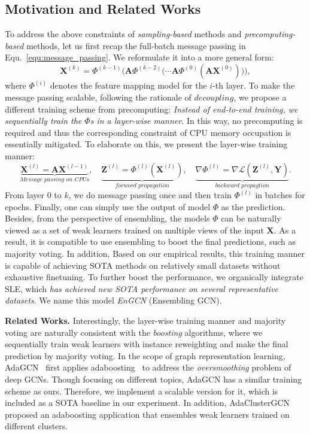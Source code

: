 \message{ !name(main.tex)}\documentclass{article}
\newcommand{\bm}[1]{\mathbf{#1}}
\begin{document}
\subsection{Motivation and Related Works}
\vspace{-1mm}
To address the above constraints of \textit{sampling-based} methods and \textit{precomputing-based} methods, let us first recap the full-batch message passing in Equ.~\eqref{equ:message_passing}. We reformulate it into a more general form:
\begin{equation*}
	\bm{X}^{(k)} = \Phi^{(k-1)}\bigg({\bm{A}}\Phi^{(k-2)}\big(\cdots \bm{A}\Phi^{(0)}({\bm{A}}\bm{X}^{(0)})\big)\bigg),
\end{equation*}
where \(\Phi^{(i)}\) denotes the feature mapping model for the \(i\)-th layer. To make the message passing scalable, following the rationale of \(decoupling\), we propose a different training scheme from precomputing: \textit{Instead of end-to-end training, we sequentially train the \(\Phi\)s in a layer-wise manner.} In this way, no precomputing is required and thus the corresponding constraint of CPU memory occupation is essentially mitigated. To elaborate on this, we present the layer-wise training manner:
\begin{equation}
	\underbrace{\bm{X}^{(l)} = \bm{A}\bm{X}^{(l-1)}}_{\textit{Message passing on CPUs}},\quad \underbrace{\bm{Z}^{(l)}=\Phi^{(l)}(\bm{X}^{(l)})}_{\textit{forword propagation}},\quad \underbrace{\nabla\Phi^{(l)}=\nabla\mathcal{L}(\bm{Z}^{(l)},\bm{Y})}_{\textit{backward propagtion}}.
\end{equation}
From layer \(0\) to \(k\), we do message passing once and then train \(\Phi^{(l)}\) in batches for epochs. Finally, one can simply use the output of model \(\Phi\) as the prediction. Besides, from the perspective of ensembling, the models \(\Phi\) can be naturally viewed as a set of weak learners trained on multiple views of the input \(\bm{X}\). As a result, it is compatible to use ensembling to boost the final predictions, such as majority voting. In addition, Based on our empirical results, this training manner is capable of achieving SOTA methods on relatively small datasets without exhaustive finetuning. To further boost the performance, we organically integrate SLE, which \textit{has achieved new SOTA performance on several representative datasets}. We name this model \textit{EnGCN} (Ensembling GCN).

\textbf{Related Works.} Interestingly, the layer-wise training manner and majority voting are naturally consistent with the \textit{boosting} algorithms, where we sequentially train weak learners with instance reweighting and make the final prediction by majority voting. In the scope of graph representation learning, AdaGCN~\cite{sun2019adagcn} first applies adaboosting~\cite{freund1999short, hastie2009multi} to address the \textit{oversmoothing} problem of deep GCNs. Though focusing on different topics, AdaGCN has a similar training scheme as ours. Therefore, we implement a scalable version for it, which is included as a SOTA baseline in our experiment. In addition, AdaClusterGCN~\cite{zheng2021adaboosting} proposed an adaboosting application that ensembles weak learners trained on different clusters.
\end{document}
